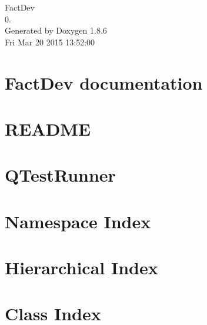 \documentclass[twoside]{book}
\newcommand{\clearemptydoublepage}{%
  \newpage{\pagestyle{empty}\cleardoublepage}%
}
\begin{document}
\hypersetup{pageanchor=false}
\begin{titlepage}
\vspace*{7cm}
\begin{center}%
{\Large Fact\-Dev \\[1ex]\large 0. }\\
\vspace*{1cm}
{\large Generated by Doxygen 1.8.6}\\
\vspace*{0.5cm}
{\small Fri Mar 20 2015 13:52:00}\\
\end{center}
\end{titlepage}
\clearemptydoublepage
\tableofcontents
\clearemptydoublepage
{}
\hypersetup{pageanchor=true}

\chapter{Fact\-Dev documentation}
\label{index}\hypertarget{index}{}
\chapter{R\-E\-A\-D\-M\-E}
\label{da/d07/md__home_travis_build_FACT-Team_FactDev_src_libs_qt-mustache_README}
\hypertarget{da/d07/md__home_travis_build_FACT-Team_FactDev_src_libs_qt-mustache_README}{}

\chapter{Q\-Test\-Runner}
\label{d7/d95/md__home_travis_build_FACT-Team_FactDev_tests_QTestRunner_README}
\hypertarget{d7/d95/md__home_travis_build_FACT-Team_FactDev_tests_QTestRunner_README}{}

\chapter{Namespace Index}

\chapter{Hierarchical Index}

\chapter{Class Index}

\end{document}
